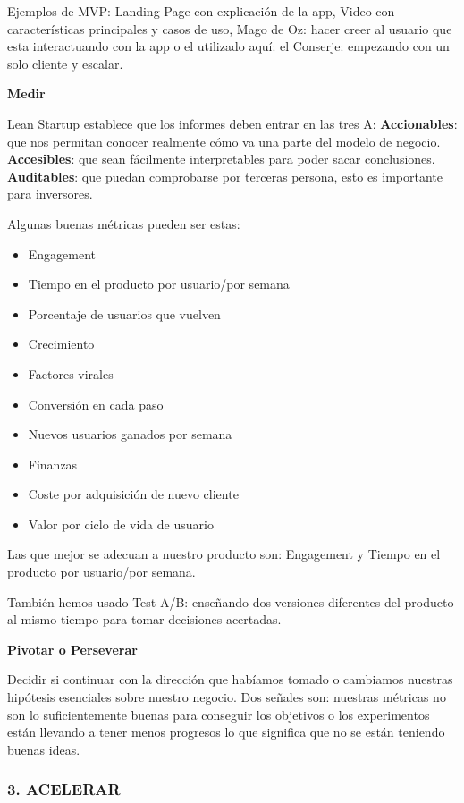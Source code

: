 \documentclass[12pt,twoside,titlepage]{report}
\begin{document}
Ejemplos de MVP: Landing Page con explicación de la app, Video con características principales y casos de uso, Mago de Oz: hacer creer al usuario que esta interactuando con la app o el utilizado aquí: el Conserje: empezando con un solo cliente y escalar.

\textbf{Medir}

Lean Startup establece que los informes deben entrar en las tres A: \textbf{Accionables}: que nos permitan conocer realmente cómo va una parte del modelo de negocio. \textbf{Accesibles}: que sean fácilmente interpretables para poder sacar conclusiones. \textbf{Auditables}: que puedan comprobarse por terceras persona, esto es importante para inversores.

Algunas buenas métricas pueden ser estas: 
\begin{itemize}
    \item Engagement
    \item Tiempo en el producto por usuario/por semana
    \item Porcentaje de usuarios que vuelven
    \item Crecimiento
    \item Factores virales
    \item Conversión en cada paso
    \item Nuevos usuarios ganados por semana
    \item Finanzas
    \item Coste por adquisición de nuevo cliente
    \item Valor por ciclo de vida de usuario
\end{itemize}


Las que mejor se adecuan a nuestro producto son: Engagement y Tiempo en el producto por usuario/por semana.

También hemos usado Test A/B: enseñando dos versiones diferentes del producto al mismo tiempo para tomar decisiones acertadas.

\textbf{Pivotar o Perseverar}

Decidir si continuar con la dirección que habíamos tomado o cambiamos nuestras hipótesis esenciales sobre nuestro negocio. Dos señales son: nuestras métricas no son lo suficientemente buenas para conseguir los objetivos o los experimentos están llevando a tener menos progresos lo que significa que no se están teniendo buenas ideas.

\subsubsection{3. ACELERAR}
\end{document}
